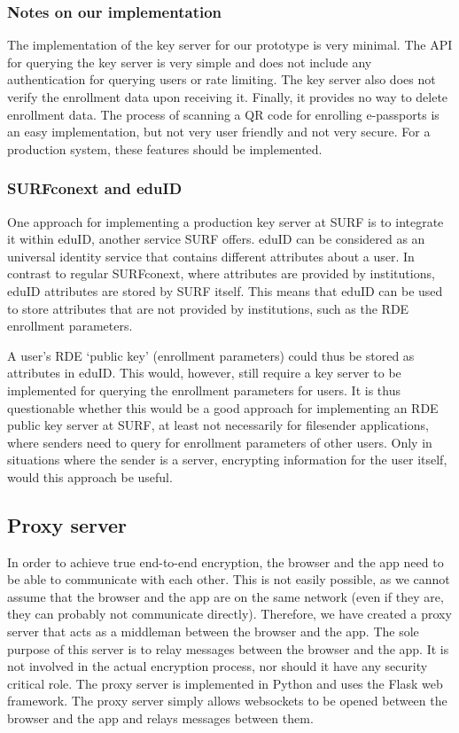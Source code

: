\subsubsection{Notes on our implementation}\label{subsubsec:keyserver-notes-on-our-implementation}
The implementation of the key server for our prototype is very minimal.
The API for querying the key server is very simple and does not include any authentication for querying users or rate limiting.
The key server also does not verify the enrollment data upon receiving it.
Finally, it provides no way to delete enrollment data.
The process of scanning a QR code for enrolling e-passports is an easy implementation, but not very user friendly and not very secure.
For a production system, these features should be implemented.

\subsubsection{SURFconext and eduID}\label{subsubsec:surfconext-and-eduid}
One approach for implementing a production key server at SURF is to integrate it within eduID, another service SURF offers.
eduID can be considered as an universal identity service that contains different attributes about a user.
In contrast to regular SURFconext, where attributes are provided by institutions, eduID attributes are stored by SURF itself.
This means that eduID can be used to store attributes that are not provided by institutions, such as the RDE enrollment parameters.

A user's RDE `public key' (enrollment parameters) could thus be stored as attributes in eduID.
This would, however, still require a key server to be implemented for querying the enrollment parameters for users.
It is thus questionable whether this would be a good approach for implementing an RDE public key server at SURF, at least not necessarily for filesender applications, where senders need to query for enrollment parameters of other users.
Only in situations where the sender is a server, encrypting information for the user itself, would this approach be useful.

\subsection{Proxy server}\label{subsec:proxy-server}
In order to achieve true end-to-end encryption, the browser and the app need to be able to communicate with each other.
This is not easily possible, as we cannot assume that the browser and the app are on the same network (even if they are, they can probably not communicate directly).
Therefore, we have created a proxy server that acts as a middleman between the browser and the app.
The sole purpose of this server is to relay messages between the browser and the app.
It is not involved in the actual encryption process, nor should it have any security critical role.
The proxy server is implemented in Python and uses the Flask web framework.
The proxy server simply allows websockets to be opened between the browser and the app and relays messages between them.

